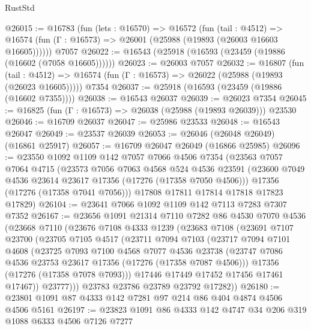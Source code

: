 \begin{lexlean}{RustStd}
\begin{coremodule}
@26015 := @16783
    (fun (lets : @16570) =>
    @16572
      (fun (tail : @4512) =>
      @16574 (fun (Γ : @16573) => @26001 (@25988 (@19893 (@26003 @16603 @16605))))))
    @7057
@26022 := @16543 (@25918 (@16593 (@23459 (@19886 (@16602 (@7058 @16605))))))
@26023 := @26003 @7057
@26032 := @16807
    (fun (tail : @4512) => @16574 (fun (Γ : @16573) => @26022 (@25988 (@19893 (@26023 @16605)))))
    @7354
@26037 := @25918 (@16593 (@23459 (@19886 (@16602 @7355))))
@26038 := @16543 @26037
@26039 := @26023 @7354
@26045 := @16825 (fun (Γ : @16573) => @26038 (@25988 (@19893 @26039))) @23530
@26046 := @16709 @26037
@26047 := @25986 @23533
@26048 := @16543 @26047
@26049 := @23537 @26039
@26053 := @26046 (@26048 @26049) (@16861 @25917)
@26057 := @16709 @26047 @26049 (@16866 @25985)
@26096 := @23550
    @1092
    @1109
    @142
    @7057
    @7066
    @4506
    @7354
    (@23563
      @7057
      @7064
      @4715
      (@23573
        @7056
        @7063
        @4568
        @524
        @4536
        @23591
        (@23600 @7049 @4536 @23614 @23617 @17356 (@17276 (@17358 @7050 @4506)))
        @17356
        (@17276 (@17358 @7041 @7056)))
      @17808
      @17811
      @17814
      @17818
      @17823
      @17829)
@26104 := @23641 @7066 @1092 @1109 @142 @7113 @7283 @7307 @7352
@26167 := @23656
    @1091
    @21314
    @7110
    @7282
    @86
    @4530
    @7070
    @4536
    (@23668
      @7110
      (@23676
        @7108
        @4333
        @1239
        (@23683
          @7108
          (@23691
            @7107
            @23700
            (@23705
              @7105
              @4517
              (@23711
                @7094
                @7103
                (@23717
                  @7094
                  @7101
                  @4608
                  (@23725
                    @7093
                    @7100
                    @4568
                    @7077
                    @4536
                    @23738
                    (@23747 @7086 @4536 @23753 @23617 @17356 (@17276 (@17358 @7087 @4506)))
                    @17356
                    (@17276 (@17358 @7078 @7093)))
                  @17446
                  @17449
                  @17452
                  @17456
                  @17461
                  @17467))
              @23777)))
        @23783
        @23786
        @23789
        @23792
        @17282))
@26180 := @23801 @1091 @87 @4333 @142 @7281 @97 @214 @86 @404 @4874 @4506 @4506 @5161
@26197 := @23823
    @1091
    @86
    @4333
    @142
    @4747
    @34
    @206
    @319
    @1088
    @6333
    @4506
    @7126
    @7277

\end{coremodule}
\end{lexlean}
